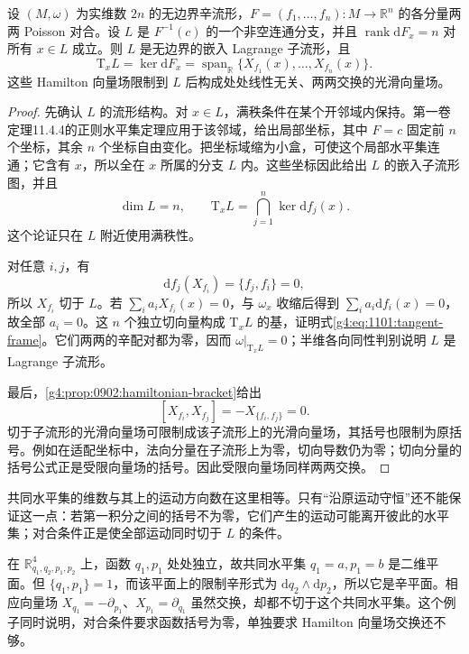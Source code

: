 \begin{proposition}\label{g4:prop:1101:regular-lagrangian-level}
	设 \((M,\omega)\) 为实维数 \(2n\) 的无边界辛流形，\(F=(f_1,\ldots,f_n):M\to\mathbb R^n\) 的各分量两两 Poisson 对合。设 \(L\) 是 \(F^{-1}(c)\) 的一个非空连通分支，并且 \(\operatorname{rank}\mathrm{d}F_x=n\) 对所有 \(x\in L\) 成立。则 \(L\) 是无边界的嵌入 Lagrange 子流形，且
	\begin{equation}\label{g4:eq:1101:tangent-frame}
		\mathrm{T}_xL=\ker\mathrm{d}F_x
		=\operatorname{span}_{\mathbb R}
		\{X_{f_1}(x),\ldots,X_{f_n}(x)\}.
	\end{equation}
	这些 Hamilton 向量场限制到 \(L\) 后构成处处线性无关、两两交换的光滑向量场。
\end{proposition}
\begin{proof}
	先确认 \(L\) 的流形结构。对 \(x\in L\)，满秩条件在某个开邻域内保持。第一卷定理11.4.4的正则水平集定理应用于该邻域，给出局部坐标，其中 \(F=c\) 固定前 \(n\) 个坐标，其余 \(n\) 个坐标自由变化。把坐标域缩为小盒，可使这个局部水平集连通；它含有 \(x\)，所以全在 \(x\) 所属的分支 \(L\) 内。这些坐标因此给出 \(L\) 的嵌入子流形图，并且
	\[
		\dim L=n,\qquad
		\mathrm{T}_xL=\bigcap_{j=1}^n\ker\mathrm{d}f_j(x).
	\]
	这个论证只在 \(L\) 附近使用满秩性。

	对任意 \(i,j\)，有
	\[
		\mathrm{d}f_j(X_{f_i})=\{f_j,f_i\}=0,
	\]
	所以 \(X_{f_i}\) 切于 \(L\)。若 \(\sum_i a_iX_{f_i}(x)=0\)，与 \(\omega_x\) 收缩后得到 \(\sum_i a_i\mathrm{d}f_i(x)=0\)，故全部 \(a_i=0\)。这 \(n\) 个独立切向量构成 \(\mathrm{T}_xL\) 的基，证明式\eqref{g4:eq:1101:tangent-frame}。它们两两的辛配对都为零，因而 \(\omega|_{\mathrm{T}_xL}=0\)；半维各向同性判别说明 \(L\) 是 Lagrange 子流形。

	最后，\cref{g4:prop:0902:hamiltonian-bracket}给出
	\[
		[X_{f_i},X_{f_j}]=-X_{\{f_i,f_j\}}=0.
	\]
	切于子流形的光滑向量场可限制成该子流形上的光滑向量场，其括号也限制为原括号。例如在适配坐标中，法向分量在子流形上为零，切向导数仍为零；切向分量的括号公式正是受限向量场的括号。因此受限向量场同样两两交换。
\end{proof}

共同水平集的维数与其上的运动方向数在这里相等。只有“沿原运动守恒”还不能保证这一点：若第一积分之间的括号不为零，它们产生的运动可能离开彼此的水平集；对合条件正是使全部运动同时切于 \(L\) 的条件。

\begin{example}\label{g4:exm:1101:noncommuting-level}
	在 \(\mathbb R^4_{q_1,q_2,p_1,p_2}\) 上，函数 \(q_1,p_1\) 处处独立，故共同水平集 \(q_1=a,p_1=b\) 是二维平面。但 \(\{q_1,p_1\}=1\)，而该平面上的限制辛形式为 \(\mathrm{d}q_2\wedge\mathrm{d}p_2\)，所以它是辛平面。相应向量场 \(X_{q_1}=-\partial_{p_1}\)、\(X_{p_1}=\partial_{q_1}\) 虽然交换，却都不切于这个共同水平集。这个例子同时说明，对合条件要求函数括号为零，单独要求 Hamilton 向量场交换还不够。
\end{example}

